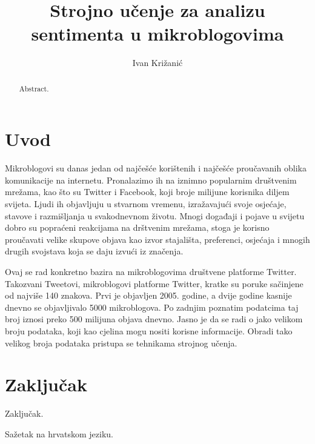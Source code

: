 \documentclass[times, utf8, zavrsni]{fer}
\begin{document}

\title{Strojno učenje za analizu sentimenta u mikroblogovima}

\author{Ivan Križanić}

\maketitle

\izvornik

\zahvala{}

\tableofcontents

\chapter{Uvod}
 
Mikroblogovi su danas jedan od najčešće korištenih i najčešće proučavanih oblika komunikacije na internetu. Pronalazimo ih na iznimno popularnim društvenim mrežama, kao što su Twitter i Facebook, koji broje milijune korisnika diljem svijeta. Ljudi ih objavljuju u stvarnom vremenu, izražavajući svoje osjećaje, stavove i razmišljanja u svakodnevnom životu. Mnogi događaji i pojave u svijetu dobro su popraćeni reakcijama na drštvenim mrežama, stoga je korisno proučavati velike skupove objava kao izvor stajališta, preferenci, osjećaja i mnogih drugih svojstava koja se daju izvući iz značenja. 

Ovaj se rad konkretno bazira na mikroblogovima društvene platforme Twitter. Takozvani Tweetovi, mikroblogovi platforme Twitter, kratke su poruke sačinjene od najviše 140 znakova. Prvi je objavljen 2005. godine, a dvije godine kasnije dnevno se objavljivalo 5000 mikroblogova. Po zadnjim poznatim podatcima taj broj iznosi preko 500 milijuna objava dnevno.\citep{twitterStats} Jasno je da se radi o jako velikom broju podataka, koji kao cjelina mogu nositi korisne informacije. Obradi tako velikog broja podataka pristupa se tehnikama strojnog učenja.



\chapter{Zaključak}
Zaključak.




\begin{sazetak}
Sažetak na hrvatskom jeziku.

\end{sazetak}

\begin{abstract}
Abstract.

\end{abstract}
\end{document}
